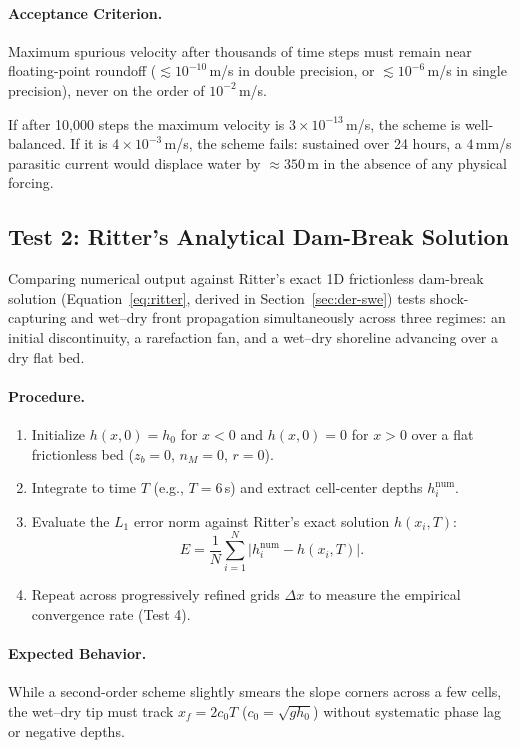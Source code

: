 \documentclass[11pt,a4paper]{article}
\begin{document}
\paragraph{Acceptance Criterion.} Maximum spurious velocity after thousands of time steps must remain near floating-point roundoff ($\lesssim 10^{-10}$\,m/s in double precision, or $\lesssim 10^{-6}$\,m/s in single precision), never on the order of $10^{-2}$\,m/s.

\begin{ejemplo}
If after 10,000 steps the maximum velocity is $3\times10^{-13}$\,m/s, the scheme is well-balanced. If it is $4\times10^{-3}$\,m/s, the scheme fails: sustained over 24 hours, a $4$\,mm/s parasitic current would displace water by $\approx350$\,m in the absence of any physical forcing.
\end{ejemplo}

\subsection{Test 2: Ritter's Analytical Dam-Break Solution}

Comparing numerical output against Ritter's exact 1D frictionless dam-break solution (Equation~\eqref{eq:ritter}, derived in Section~\ref{sec:der-swe}) tests shock-capturing and wet--dry front propagation simultaneously across three regimes: an initial discontinuity, a rarefaction fan, and a wet--dry shoreline advancing over a dry flat bed.

\paragraph{Procedure.}
\begin{enumerate}
  \item Initialize $h(x,0)=h_0$ for $x<0$ and $h(x,0)=0$ for $x>0$ over a flat frictionless bed ($z_b=0$, $n_M=0$, $r=0$).
  \item Integrate to time $T$ (e.g., $T=6$\,s) and extract cell-center depths $h_i^{\text{num}}$.
  \item Evaluate the $L_1$ error norm against Ritter's exact solution $h(x_i,T)$:
        \[
          E=\frac{1}{N}\sum_{i=1}^{N}\bigl|h_i^{\text{num}}-h(x_i,T)\bigr| .
        \]
  \item Repeat across progressively refined grids $\Delta x$ to measure the empirical convergence rate (Test 4).
\end{enumerate}

\paragraph{Expected Behavior.} While a second-order scheme slightly smears the slope corners across a few cells, the wet--dry tip must track $x_f=2c_0T$ ($c_0=\sqrt{gh_0}$) without systematic phase lag or negative depths.
\end{document}
